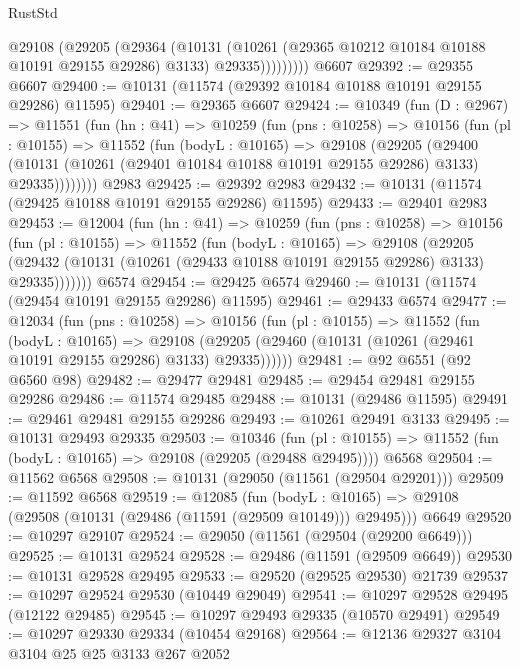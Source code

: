 \begin{lexlean}{RustStd}
\begin{coremodule}
              @29108
                (@29205
                  (@29364
                    (@10131
                      (@10261 (@29365 @10212 @10184 @10188 @10191 @29155 @29286) @3133)
                      @29335)))))))))
    @6607
@29392 := @29355 @6607
@29400 := @10131 (@11574 (@29392 @10184 @10188 @10191 @29155 @29286) @11595)
@29401 := @29365 @6607
@29424 := @10349
    (fun (D : @2967) =>
    @11551
      (fun (hn : @41) =>
      @10259
        (fun (pns : @10258) =>
        @10156
          (fun (pl : @10155) =>
          @11552
            (fun (bodyL : @10165) =>
            @29108
              (@29205
                (@29400
                  (@10131 (@10261 (@29401 @10184 @10188 @10191 @29155 @29286) @3133) @29335))))))))
    @2983
@29425 := @29392 @2983
@29432 := @10131 (@11574 (@29425 @10188 @10191 @29155 @29286) @11595)
@29433 := @29401 @2983
@29453 := @12004
    (fun (hn : @41) =>
    @10259
      (fun (pns : @10258) =>
      @10156
        (fun (pl : @10155) =>
        @11552
          (fun (bodyL : @10165) =>
          @29108
            (@29205
              (@29432 (@10131 (@10261 (@29433 @10188 @10191 @29155 @29286) @3133) @29335)))))))
    @6574
@29454 := @29425 @6574
@29460 := @10131 (@11574 (@29454 @10191 @29155 @29286) @11595)
@29461 := @29433 @6574
@29477 := @12034
    (fun (pns : @10258) =>
    @10156
      (fun (pl : @10155) =>
      @11552
        (fun (bodyL : @10165) =>
        @29108 (@29205 (@29460 (@10131 (@10261 (@29461 @10191 @29155 @29286) @3133) @29335))))))
@29481 := @92 @6551 (@92 @6560 @98)
@29482 := @29477 @29481
@29485 := @29454 @29481 @29155 @29286
@29486 := @11574 @29485
@29488 := @10131 (@29486 @11595)
@29491 := @29461 @29481 @29155 @29286
@29493 := @10261 @29491 @3133
@29495 := @10131 @29493 @29335
@29503 := @10346
    (fun (pl : @10155) => @11552 (fun (bodyL : @10165) => @29108 (@29205 (@29488 @29495))))
    @6568
@29504 := @11562 @6568
@29508 := @10131 (@29050 (@11561 (@29504 @29201)))
@29509 := @11592 @6568
@29519 := @12085
    (fun (bodyL : @10165) => @29108 (@29508 (@10131 (@29486 (@11591 (@29509 @10149))) @29495)))
    @6649
@29520 := @10297 @29107
@29524 := @29050 (@11561 (@29504 (@29200 @6649)))
@29525 := @10131 @29524
@29528 := @29486 (@11591 (@29509 @6649))
@29530 := @10131 @29528 @29495
@29533 := @29520 (@29525 @29530) @21739
@29537 := @10297 @29524 @29530 (@10449 @29049)
@29541 := @10297 @29528 @29495 (@12122 @29485)
@29545 := @10297 @29493 @29335 (@10570 @29491)
@29549 := @10297 @29330 @29334 (@10454 @29168)
@29564 := @12136
    @29327
    @3104
    @3104
    @25
    @25
    @3133
    @267
    @2052

\end{coremodule}
\end{lexlean}
